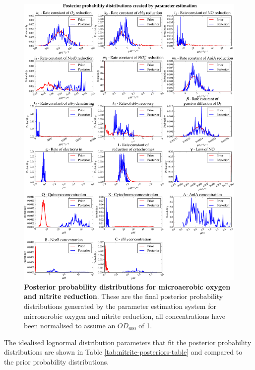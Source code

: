 \begin{figure}[tbp]
 \centering
 \includegraphics[width=15cm, trim=0cm 0cm 0cm 0cm, clip=true]{./07-nitritereduction/data/posteriors.pdf}
 \caption[Posterior probability distributions for microaerobic oxygen and nitrite reduction]{{\bf Posterior probability distributions for microaerobic oxygen and nitrite reduction}. These are the final posterior probability distributions generated by the parameter estimation system for microaerobic oxygen and nitrite reduction, all concentrations have been normalised to assume an $OD_{600}$ of 1.
 \label{fig:nitrite_posteriors1}}
\end{figure}
\afterpage{\clearpage}

The idealised lognormal distribution parameters that fit the posterior probability distributions are shown in Table \ref{tab:nitrite-posteriors-table} and compared to the prior probability distributions.

